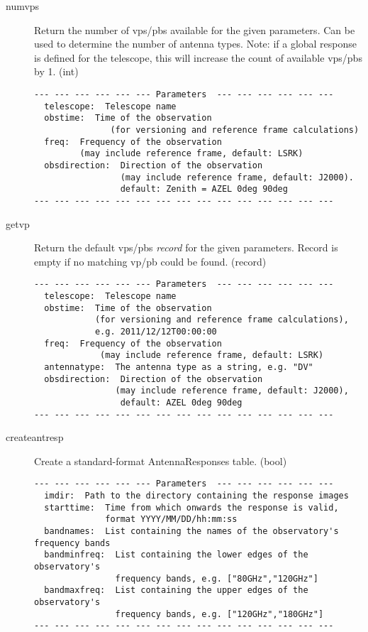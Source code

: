 \documentclass[12pt]{article}
\begin{document}
\begin{description}
  \item[numvps]
   Return the number of vps/pbs available for the given parameters.
   Can be used to determine the number of antenna types.
   Note: if a global response is defined for the telescope, this will increase the count of
   available vps/pbs by 1. (int)
{\small
\begin{verbatim}
--- --- --- --- --- --- Parameters  --- --- --- --- --- ---
  telescope:  Telescope name 
  obstime:  Time of the observation 
               (for versioning and reference frame calculations) 
  freq:  Frequency of the observation 
         (may include reference frame, default: LSRK) 
  obsdirection:  Direction of the observation 
                 (may include reference frame, default: J2000). 
                 default: Zenith = AZEL 0deg 90deg 
--- --- --- --- --- --- --- --- --- --- --- --- --- --- ---
\end{verbatim} 
} 


  \item[getvp]
   Return the default vps/pbs {\it record} for the given parameters.
   Record is empty if no matching vp/pb could be found. (record)

{\small
\begin{verbatim}
--- --- --- --- --- --- Parameters  --- --- --- --- --- ---
  telescope:  Telescope name 
  obstime:  Time of the observation 
            (for versioning and reference frame calculations), 
            e.g. 2011/12/12T00:00:00 
  freq:  Frequency of the observation 
             (may include reference frame, default: LSRK) 
  antennatype:  The antenna type as a string, e.g. "DV" 
  obsdirection:  Direction of the observation 
                (may include reference frame, default: J2000), 
                 default: AZEL 0deg 90deg 
--- --- --- --- --- --- --- --- --- --- --- --- --- --- ---
\end{verbatim} 
} 

  \item[createantresp]
   Create a standard-format AntennaResponses table. (bool)

{\small
\begin{verbatim}
--- --- --- --- --- --- Parameters  --- --- --- --- --- ---
  imdir:  Path to the directory containing the response images 
  starttime:  Time from which onwards the response is valid, 
              format YYYY/MM/DD/hh:mm:ss 
  bandnames:  List containing the names of the observatory's frequency bands 
  bandminfreq:  List containing the lower edges of the observatory's 
                frequency bands, e.g. ["80GHz","120GHz"] 
  bandmaxfreq:  List containing the upper edges of the observatory's 
                frequency bands, e.g. ["120GHz","180GHz"] 
--- --- --- --- --- --- --- --- --- --- --- --- --- --- ---
\end{verbatim} 
} 


\end{description}
\end{document}

